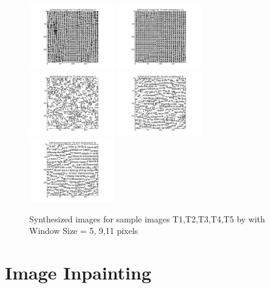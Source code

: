 \documentclass{extarticle}
\theoremstyle{definition}
\theoremstyle{definition}
\begin{document}
\begin{figure}[H]
	\includegraphics[width = 0.33\textwidth]{./figures/Syth_T4_size_9.png}
	\includegraphics[width = 0.33\textwidth]{./figures/Syth_T4_size_11.png}
	\includegraphics[width = 0.33\textwidth]{./figures/Syth_T5_size_5.png}
	\includegraphics[width = 0.33\textwidth]{./figures/Syth_T5_size_9.png}
	\includegraphics[width = 0.33\textwidth]{./figures/Syth_T5_size_11.png}
	\caption{Synthesized images for sample images T1,T2,T3,T4,T5 by with Window Size = 5, 9,11 pixels}
	\label{fig_syth}
\end{figure}
\section{Image Inpainting}
\end{document}
